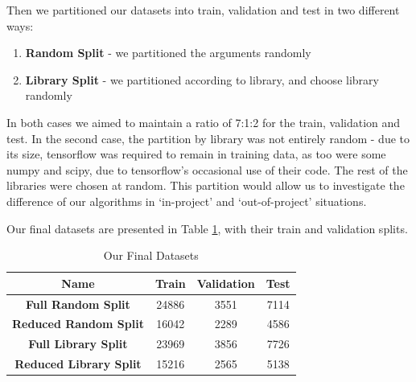 Then we partitioned our datasets into train, validation and test in two different ways:
\begin{enumerate}
    \item \textbf{Random Split} - we partitioned the arguments randomly
    \item \textbf{Library Split} - we partitioned according to library, and choose library randomly
\end{enumerate}

In both cases we aimed to maintain a ratio of 7:1:2 for the train, validation and test. In the second case, the partition by library was not entirely random - due to its size, tensorflow was required to remain in training data, as too were some numpy and scipy, due to tensorflow's occasional use of their code. The rest of the libraries were chosen at random. This partition would allow us to investigate the difference of our algorithms in `in-project' and `out-of-project' situations.

Our final datasets are presented in Table \ref{tab:final_datasets}, with their train and validation splits.



\begin{table}[tb]
    \centering

    \begin{tabular}{c c c c}
    \hline
    Name       & Train & Validation & Test \\
    \hline
    \hline
    \textbf{Full Random Split}         & 24886 & 3551 & 7114 \\
    \textbf{Reduced Random Split}      & 16042 & 2289 & 4586\\
    \hline
    \hline
    \textbf{Full Library Split}         & 23969 & 3856 &7726 \\
    \textbf{Reduced Library Split}      & 15216 & 2565 & 5138 \\
    \hline
    \hline
    \end{tabular}
    \caption{Our Final Datasets}
    \label{tab:final_datasets}
\end{table}
